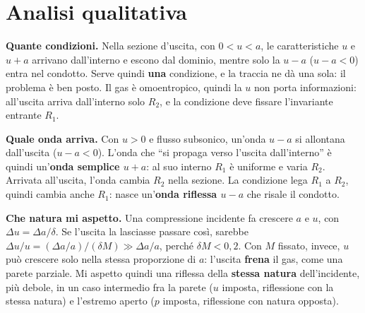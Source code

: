 \documentclass[11pt,a4paper]{article}
\newcommand{\Ru}{R_1}
\newcommand{\Rd}{R_2}
\newcommand{\uma}{u-a}
\newcommand{\upa}{u+a}
\begin{document}
\section{Analisi qualitativa}
\textbf{Quante condizioni.} Nella sezione d'uscita, con $0<u<a$, le caratteristiche $u$ e $\upa$ arrivano
dall'interno e escono dal dominio, mentre solo la $\uma$ ($u-a<0$) entra nel condotto. Serve quindi
\textbf{una} condizione, e la traccia ne dà una sola: il problema è ben posto. Il gas è omoentropico, quindi la
$u$ non porta informazioni: all'uscita arriva dall'interno solo $\Rd$, e la condizione deve fissare l'invariante
entrante $\Ru$.

\textbf{Quale onda arriva.} Con $u>0$ e flusso subsonico, un'onda $\uma$ si allontana dall'uscita ($u-a<0$).
L'onda che ``si propaga verso l'uscita dall'interno'' è quindi un'\textbf{onda semplice $\upa$}: al suo interno
$\Ru$ è uniforme e varia $\Rd$. Arrivata all'uscita, l'onda cambia $\Rd$ nella sezione. La condizione lega $\Ru$ a
$\Rd$, quindi cambia anche $\Ru$: nasce un'\textbf{onda riflessa $\uma$} che risale il condotto.

\textbf{Che natura mi aspetto.} Una compressione incidente fa crescere $a$ e $u$, con $\Delta u=\Delta a/\delta$.
Se l'uscita la lasciasse passare così, sarebbe $\Delta u/u=(\Delta a/a)/(\delta M)\gg\Delta a/a$, perché
$\delta M<0{,}2$. Con $M$ fissato, invece, $u$ può crescere solo nella stessa proporzione di $a$: l'uscita
\textbf{frena} il gas, come una parete parziale. Mi aspetto quindi una riflessa della \textbf{stessa natura}
dell'incidente, più debole, in un caso intermedio fra la parete ($u$ imposta, riflessione con la stessa natura) e
l'estremo aperto ($p$ imposta, riflessione con natura opposta).

\end{document}
